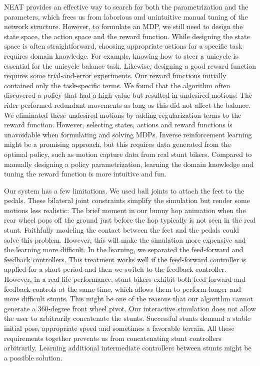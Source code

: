 NEAT provides an effective way to search for both the parametrization and the parameters, which frees us from laborious and unintuitive manual tuning of the network structure. However, to formulate an MDP, we still need to design the state space, the action space and the reward function. While designing the state space is often straightforward, choosing appropriate actions for a specific task requires domain knowledge. For example, knowing how to steer a unicycle is essential for the unicycle balance task. Likewise, designing a good reward function requires some trial-and-error experiments. Our reward functions initially contained only the task-specific terms. We found that the algorithm often discovered a policy that had a high value but resulted in undesired motions: The rider performed redundant movements as long as this did not affect the balance. We eliminated these undesired motions by adding regularization terms to the reward function. However, selecting states, actions and reward functions is unavoidable when formulating and solving MDPs. Inverse reinforcement learning \cite{Ng:2000} might be a promising approach, but this requires data generated from the optimal policy, such as motion capture data from real stunt bikers. Compared to manually designing a policy parametrization, learning the domain knowledge and tuning the reward function is more intuitive and fun.

Our system has a few limitations. We used ball joints to attach the feet to the pedals. These bilateral joint constraints simplify the simulation but render some motions less realistic: The brief moment in our bunny hop animation when the rear wheel pops off the ground just before the hop typically is not seen in the real stunt. Faithfully modeling the contact between the feet and the pedals could solve this problem. However, this will make the simulation more expensive and the learning more difficult. In the learning, we separated the feed-forward and feedback controllers. This treatment works well if the feed-forward controller is applied for a short period and then we switch to the feedback controller. However, in a real-life performance, stunt bikers exhibit both feed-forward and feedback controls at the same time, which allows them to perform longer and more difficult stunts. This might be one of the reasons that our algorithm cannot generate a 360-degree front wheel pivot. Our interactive simulation does not allow the user to arbitrarily concatenate the stunts. Successful stunts demand a stable initial pose, appropriate speed and sometimes a favorable terrain. All these requirements together prevents us from concatenating stunt controllers arbitrarily. Learning additional intermediate controllers between stunts might be a possible solution.

